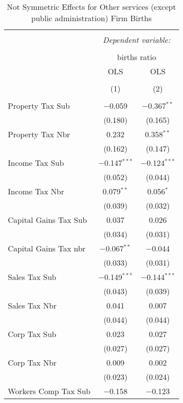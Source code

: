 
\begin{table}[!htbp] \centering 
  \caption{Not Symmetric Effects for  Other services (except public administration) Firm Births} 
  \label{} 
\begin{tabular}{@{\extracolsep{5pt}}lcc} 
\\[-1.8ex]\hline 
\hline \\[-1.8ex] 
 & \multicolumn{2}{c}{\textit{Dependent variable:}} \\ 
\cline{2-3} 
\\[-1.8ex] & \multicolumn{2}{c}{births ratio} \\ 
 & OLS & OLS \\ 
\\[-1.8ex] & (1) & (2)\\ 
\hline \\[-1.8ex] 
 Property Tax Sub & $-$0.059 & $-$0.367$^{**}$ \\ 
  & (0.180) & (0.165) \\ 
  Property Tax Nbr & 0.232 & 0.358$^{**}$ \\ 
  & (0.162) & (0.147) \\ 
  Income Tax Sub & $-$0.147$^{***}$ & $-$0.124$^{***}$ \\ 
  & (0.052) & (0.044) \\ 
  Income Tax Nbr & 0.079$^{**}$ & 0.056$^{*}$ \\ 
  & (0.039) & (0.032) \\ 
  Capital Gains Tax Sub & 0.037 & 0.026 \\ 
  & (0.034) & (0.031) \\ 
  Capital Gains Tax nbr & $-$0.067$^{**}$ & $-$0.044 \\ 
  & (0.033) & (0.031) \\ 
  Sales Tax Sub & $-$0.149$^{***}$ & $-$0.144$^{***}$ \\ 
  & (0.043) & (0.039) \\ 
  Sales Tax Nbr & 0.041 & 0.007 \\ 
  & (0.044) & (0.044) \\ 
  Corp Tax Sub & 0.023 & 0.027 \\ 
  & (0.027) & (0.027) \\ 
  Corp Tax Nbr & 0.009 & 0.002 \\ 
  & (0.023) & (0.024) \\ 
  Workers Comp Tax Sub & $-$0.158 & $-$0.123 \\ 

\end{tabular}
\end{table}
